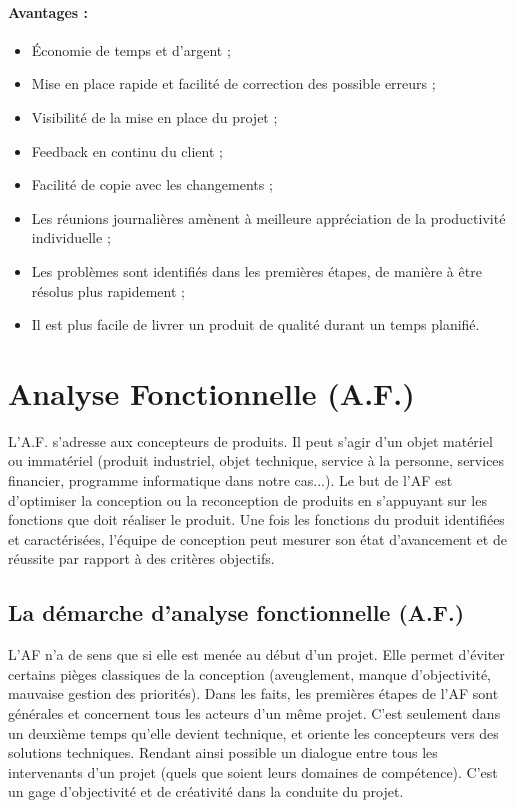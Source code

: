 \paragraph{Avantages : }
\begin{itemize}
    \item Économie de temps et d'argent ;
    \item Mise en place rapide et facilité de correction des possible erreurs ;
    \item Visibilité de la mise en place du projet ;
    \item Feedback en continu du client ;
    \item Facilité de copie avec les changements ;
    \item Les réunions journalières amènent à meilleure appréciation de la productivité individuelle ;
    \item Les problèmes sont identifiés dans les premières étapes, de manière à être résolus plus rapidement ;
    \item Il est plus facile de livrer un produit de qualité durant un temps planifié.
\end{itemize}







\section{Analyse Fonctionnelle (A.F.)}
L’A.F. s’adresse aux concepteurs de produits. Il peut s’agir d’un objet matériel ou immatériel (produit industriel, objet technique, service à la personne, services financier, programme informatique dans notre cas...). Le but de l’AF est d’optimiser la conception ou la reconception de produits en s’appuyant sur les fonctions que doit réaliser le produit. Une fois les fonctions du produit identifiées et caractérisées, l’équipe de conception peut mesurer son état d’avancement et de réussite par rapport à des critères objectifs.

\subsection{La démarche d’analyse fonctionnelle (A.F.)}
L’AF n’a de sens que si elle est menée au début d’un projet. Elle permet d’éviter certains pièges classiques de la conception (aveuglement, manque d’objectivité, mauvaise gestion des priorités). Dans les faits, les premières étapes de l’AF sont générales et concernent tous les acteurs d’un même projet. C’est seulement dans un deuxième temps qu'elle devient technique, et oriente les concepteurs vers des solutions techniques. Rendant ainsi possible un dialogue entre tous les intervenants d’un projet (quels que soient leurs domaines de compétence). C’est un gage d’objectivité et de créativité dans la conduite du projet.

